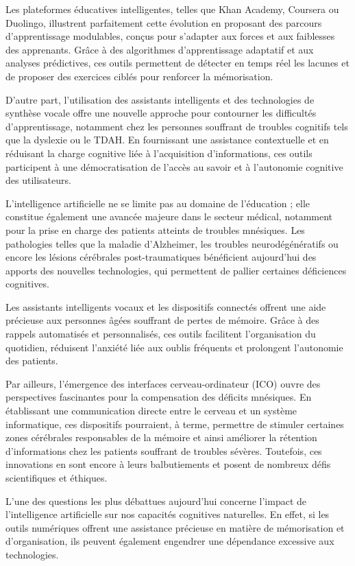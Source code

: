 \documentclass[11pt,a4paper]{report}
\begin{document}
Les plateformes éducatives intelligentes, telles que Khan Academy, Coursera ou Duolingo, illustrent parfaitement cette évolution en proposant des parcours d’apprentissage modulables, conçus pour s’adapter aux forces et aux faiblesses des apprenants. Grâce à des algorithmes d’apprentissage adaptatif et aux analyses prédictives, ces outils permettent de détecter en temps réel les lacunes et de proposer des exercices ciblés pour renforcer la mémorisation.

D’autre part, l’utilisation des assistants intelligents et des technologies de synthèse vocale offre une nouvelle approche pour contourner les difficultés d’apprentissage, notamment chez les personnes souffrant de troubles cognitifs tels que la dyslexie ou le TDAH. En fournissant une assistance contextuelle et en réduisant la charge cognitive liée à l’acquisition d’informations, ces outils participent à une démocratisation de l’accès au savoir et à l’autonomie cognitive des utilisateurs.

L’intelligence artificielle ne se limite pas au domaine de l’éducation ; elle constitue également une avancée majeure dans le secteur médical, notamment pour la prise en charge des patients atteints de troubles mnésiques. Les pathologies telles que la maladie d’Alzheimer, les troubles neurodégénératifs ou encore les lésions cérébrales post-traumatiques bénéficient aujourd’hui des apports des nouvelles technologies, qui permettent de pallier certaines déficiences cognitives.

Les assistants intelligents vocaux et les dispositifs connectés offrent une aide précieuse aux personnes âgées souffrant de pertes de mémoire. Grâce à des rappels automatisés et personnalisés, ces outils facilitent l’organisation du quotidien, réduisent l’anxiété liée aux oublis fréquents et prolongent l’autonomie des patients.

Par ailleurs, l’émergence des interfaces cerveau-ordinateur (ICO) ouvre des perspectives fascinantes pour la compensation des déficits mnésiques. En établissant une communication directe entre le cerveau et un système informatique, ces dispositifs pourraient, à terme, permettre de stimuler certaines zones cérébrales responsables de la mémoire et ainsi améliorer la rétention d’informations chez les patients souffrant de troubles sévères. Toutefois, ces innovations en sont encore à leurs balbutiements et posent de nombreux défis scientifiques et éthiques.

L’une des questions les plus débattues aujourd’hui concerne l’impact de l’intelligence artificielle sur nos capacités cognitives naturelles. En effet, si les outils numériques offrent une assistance précieuse en matière de mémorisation et d’organisation, ils peuvent également engendrer une dépendance excessive aux technologies.
\end{document}
